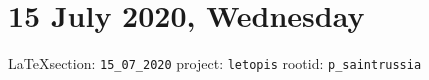  
 
\section{15 July 2020, Wednesday}

\vspace{0.5cm}
{\small\LaTeX section: \verb|15_07_2020| project: \verb|letopis| rootid: \verb|p_saintrussia|}
\vspace{0.5cm}

  

